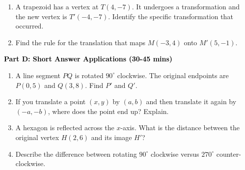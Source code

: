 \documentclass[12pt, letterpaper, fleqn]{article}
\begin{document}
\begin{enumerate}[itemsep=4.2cm, leftmargin=0.6cm, resume]
\item A trapezoid has a vertex at $T(4, -7)$. It undergoes a transformation and the new vertex is $T'(-4, -7)$. Identify the specific transformation that occurred.
\item Find the rule for the translation that maps $M(-3, 4)$ onto $M'(5, -1)$.
\end{enumerate}

\newpage

\begin{tcolorbox}[colback=customteal!20]
\large\textcolor{black}{\textbf{Part D: Short Answer Applications (30-45 mins)}}
\end{tcolorbox}

\vspace{3mm}

\begin{enumerate}[itemsep=4.2cm, leftmargin=0.6cm, resume]
\item A line segment $PQ$ is rotated $90^\circ$ clockwise. The original endpoints are $P(0, 5)$ and $Q(3, 8)$. Find $P'$ and $Q'$.
\item If you translate a point $(x, y)$ by $(a, b)$ and then translate it again by $(-a, -b)$, where does the point end up? Explain.
\item A hexagon is reflected across the $x$-axis. What is the distance between the original vertex $H(2, 6)$ and its image $H'$?
\item Describe the difference between rotating $90^\circ$ clockwise versus $270^\circ$ counter-clockwise.
\end{enumerate}
\end{document}
